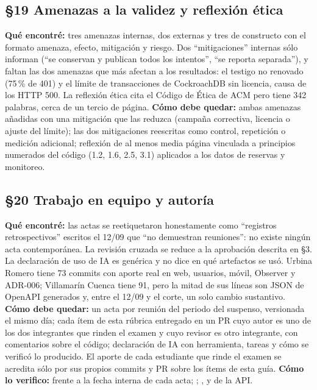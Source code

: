 \subsection*{\S19 Amenazas a la validez y reflexi\'on \'etica}
\textbf{Qu\'e encontr\'e:} tres amenazas internas, dos externas y tres de constructo con el formato amenaza, efecto, mitigaci\'on y riesgo. Dos ``mitigaciones'' internas s\'olo informan (``se conservan y publican todos los intentos'', ``se reporta separada''), y faltan las dos amenazas que m\'as afectan a los resultados: el testigo no renovado (75\,\% de 401) y el l\'imite de transacciones de CockroachDB sin licencia, causa de los HTTP 500. La reflexi\'on \'etica cita el C\'odigo de \'Etica de ACM pero tiene 342 palabras, cerca de un tercio de p\'agina. \textbf{C\'omo debe quedar:} ambas amenazas a\~nadidas con una mitigaci\'on que las reduzca (campa\~na correctiva, licencia o ajuste del l\'imite); las dos mitigaciones reescritas como control, repetici\'on o medici\'on adicional; reflexi\'on de al menos media p\'agina vinculada a principios numerados del c\'odigo (1.2, 1.6, 2.5, 3.1) aplicados a los datos de reservas y monitoreo.

\subsection*{\S20 Trabajo en equipo y autor\'ia}
\textbf{Qu\'e encontr\'e:} las actas se reetiquetaron honestamente como ``registros retrospectivos'' escritos el 12/09 que ``no demuestran reuniones'': no existe ning\'un acta contempor\'anea. La revisi\'on cruzada se reduce a la aprobaci\'on descrita en \S3. La declaraci\'on de uso de IA es gen\'erica y no dice en qu\'e artefactos se us\'o. Urbina Romero tiene 73 commits con aporte real en web, usuarios, m\'ovil, Observer y ADR-006; Villamar\'in Cuenca tiene 91, pero la mitad de sus l\'ineas son JSON de OpenAPI generados y, entre el 12/09 y el corte, un solo cambio sustantivo. \textbf{C\'omo debe quedar:} un acta por reuni\'on del periodo del suspenso, versionada el mismo d\'ia; cada \'item de esta r\'ubrica entregado en un PR cuyo autor es uno de los dos integrantes que rinden el examen y cuyo revisor es otro integrante, con comentarios sobre el c\'odigo; declaraci\'on de IA con herramienta, tareas y c\'omo se verific\'o lo producido. El aporte de cada estudiante que rinde el examen se acredita s\'olo por sus propios commits y PR sobre los \'items de esta gu\'ia. \textbf{C\'omo lo verifico:}  frente a la fecha interna de cada acta; ; ,  y  de la API.

